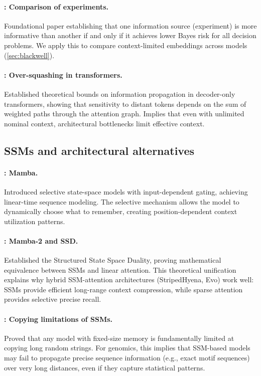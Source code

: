 \paragraph{\citet{Blackwell1951Comparison}: Comparison of experiments.}
Foundational paper establishing that one information source (experiment) is more informative than another if and only if it achieves lower Bayes risk for all decision problems. We apply this to compare context-limited embeddings across models (\cref{sec:blackwell}).

\paragraph{\citet{Barbero2024OverSquashing}: Over-squashing in transformers.}
Established theoretical bounds on information propagation in decoder-only transformers, showing that sensitivity to distant tokens depends on the sum of weighted paths through the attention graph. Implies that even with unlimited nominal context, architectural bottlenecks limit effective context.

\subsection{SSMs and architectural alternatives}

\paragraph{\citet{Gu2023Mamba}: Mamba.}
Introduced selective state-space models with input-dependent gating, achieving linear-time sequence modeling. The selective mechanism allows the model to dynamically choose what to remember, creating position-dependent context utilization patterns.

\paragraph{\citet{Dao2024Mamba2}: Mamba-2 and SSD.}
Established the Structured State Space Duality, proving mathematical equivalence between SSMs and linear attention. This theoretical unification explains why hybrid SSM-attention architectures (StripedHyena, Evo) work well: SSMs provide efficient long-range context compression, while sparse attention provides selective precise recall.

\paragraph{\citet{Jelassi2024Copying}: Copying limitations of SSMs.}
Proved that any model with fixed-size memory is fundamentally limited at copying long random strings. For genomics, this implies that SSM-based models may fail to propagate precise sequence information (e.g., exact motif sequences) over very long distances, even if they capture statistical patterns.

